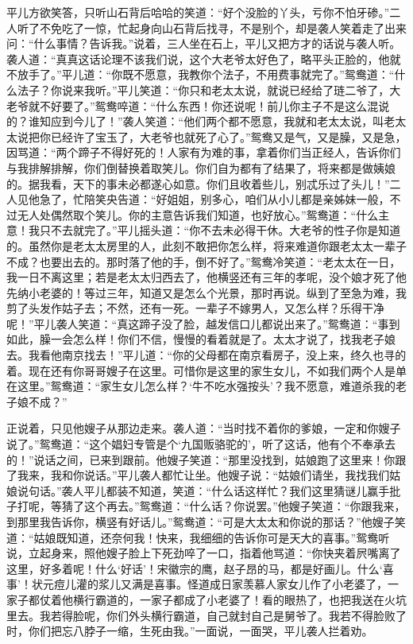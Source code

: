 平儿方欲笑答，只听山石背后哈哈的笑道：“好个没脸的丫头，亏你不怕牙碜。”二人听了不免吃了一惊，忙起身向山石背后找寻，不是别个，却是袭人笑着走了出来问：“什么事情？告诉我。”说着，三人坐在石上，平儿又把方才的话说与袭人听。袭人道：“真真这话论理不该我们说，这个大老爷太好色了，略平头正脸的，他就不放手了。”平儿道：“你既不愿意，我教你个法子，不用费事就完了。”鸳鸯道：“什么法子？你说来我听。”平儿笑道：“你只和老太太说，就说已经给了琏二爷了，大老爷就不好要了。”鸳鸯啐道：“什么东西！你还说呢！前儿你主子不是这么混说的？谁知应到今儿了！”袭人笑道：“他们两个都不愿意，我就和老太太说，叫老太太说把你已经许了宝玉了，大老爷也就死了心了。”鸳鸯又是气，又是臊，又是急，因骂道：“两个蹄子不得好死的！人家有为难的事，拿着你们当正经人，告诉你们与我排解排解，你们倒替换着取笑儿。你们自为都有了结果了，将来都是做姨娘的。据我看，天下的事未必都遂心如意。你们且收着些儿，别忒乐过了头儿！”二人见他急了，忙陪笑央告道：“好姐姐，别多心，咱们从小儿都是亲姊妹一般，不过无人处偶然取个笑儿。你的主意告诉我们知道，也好放心。”鸳鸯道：“什么主意！我只不去就完了。”平儿摇头道：“你不去未必得干休。大老爷的性子你是知道的。虽然你是老太太房里的人，此刻不敢把你怎么样，将来难道你跟老太太一辈子不成？也要出去的。那时落了他的手，倒不好了。”鸳鸯冷笑道：“老太太在一日，我一日不离这里；若是老太太归西去了，他横竖还有三年的孝呢，没个娘才死了他先纳小老婆的！等过三年，知道又是怎么个光景，那时再说。纵到了至急为难，我剪了头发作姑子去；不然，还有一死。一辈子不嫁男人，又怎么样？乐得干净呢！”平儿袭人笑道：“真这蹄子没了脸，越发信口儿都说出来了。”鸳鸯道：“事到如此，臊一会怎么样！你们不信，慢慢的看着就是了。太太才说了，找我老子娘去。我看他南京找去！”平儿道：“你的父母都在南京看房子，没上来，终久也寻的着。现在还有你哥哥嫂子在这里。可惜你是这里的家生女儿，不如我们两个人是单在这里。”鸳鸯道：“家生女儿怎么样？‘牛不吃水强按头’？我不愿意，难道杀我的老子娘不成？”

正说着，只见他嫂子从那边走来。袭人道：“当时找不着你的爹娘，一定和你嫂子说了。”鸳鸯道：“这个娼妇专管是个‘九国贩骆驼的’，听了这话，他有个不奉承去的！”说话之间，已来到跟前。他嫂子笑道：“那里没找到，姑娘跑了这里来！你跟了我来，我和你说话。”平儿袭人都忙让坐。他嫂子说：“姑娘们请坐，我找我们姑娘说句话。”袭人平儿都装不知道，笑道：“什么话这样忙？我们这里猜谜儿赢手批子打呢，等猜了这个再去。”鸳鸯道：“什么话？你说罢。”他嫂子笑道：“你跟我来，到那里我告诉你，横竖有好话儿。”鸳鸯道：“可是大太太和你说的那话？”他嫂子笑道：“姑娘既知道，还奈何我！快来，我细细的告诉你可是天大的喜事。”鸳鸯听说，立起身来，照他嫂子脸上下死劲啐了一口，指着他骂道：“你快夹着屄嘴离了这里，好多着呢！什么‘好话’！宋徽宗的鹰，赵子昂的马，都是好画儿。什么‘喜事’！状元痘儿灌的浆儿又满是喜事。怪道成日家羡慕人家女儿作了小老婆了，一家子都仗着他横行霸道的，一家子都成了小老婆了！看的眼热了，也把我送在火坑里去。我若得脸呢，你们外头横行霸道，自己就封自己是舅爷了。我若不得脸败了时，你们把忘八脖子一缩，生死由我。”一面说，一面哭，平儿袭人拦着劝。

